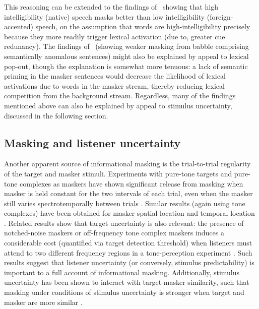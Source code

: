 This reasoning can be extended to the findings of \citeauthor{CalandruccioEtAl2010}\ showing that high intelligibility (native) speech masks better than low intelligibility (foreign-accented) speech, on the assumption that words are high-intelligibility precisely because they more readily trigger lexical activation (due to, \eg{} greater cue redunancy).  The findings of \citeauthor{BrouwerEtAl2012}\ (showing weaker masking from babble comprising semantically anomalous sentences) might also be explained by appeal to lexical pop-out, though the explanation is somewhat more tenuous: a lack of semantic priming in the masker sentences would decrease the likelihood of lexical activations due to words in the masker stream, thereby reducing lexical competition from the background stream.  Regardless, many of the findings mentioned above can also be explained by appeal to stimulus uncertainty, discussed in the following section. %

\subsection{Masking and listener uncertainty\label{sec:uncertainty}}
Another apparent source of informational masking is the trial-to-trial regularity of the target and masker stimuli.  Experiments with pure-tone targets and pure-tone complexes as maskers have shown significant release from masking when masker is held constant for the two intervals of each trial, even when the masker still varies spectrotemporally between trials \citep{NeffGreen1987, NeffCallahan1988}.  Similar results (again using tone complexes) have been obtained for masker spatial location \citep{FanEtAl2008} and temporal location \citep{BoninoLeibold2008}.  Related results show that target uncertainty is also relevant: the presence of notched-noise maskers or off-frequency tone complex maskers induces a considerable cost (quantified via target detection threshold) when listeners must attend to two different frequency regions in a tone-perception experiment \citep{KiddEtAl2008}.  Such results suggest that listener uncertainty (or conversely, stimulus predictability) is important to a full account of informational masking.  Additionally, stimulus uncertainty has been shown to interact with target-masker similarity, such that masking under conditions of stimulus uncertainty is stronger when target and masker are more similar \citep{DurlachEtAl2003b}.


